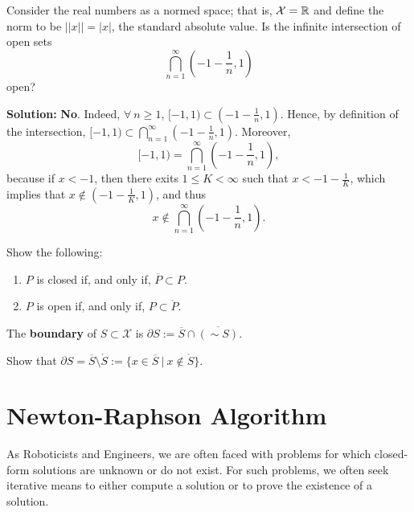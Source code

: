   
 \begin{example} Consider the real numbers as a normed space; that is,  ${\cal X} = \mathbb R$ and define the norm to be $||x|| = |x|$, the standard absolute value. Is the infinite intersection of open sets $$ \bigcap\limits_{n=1}^{\infty} (-1- \frac{1}{n}, 1)    $$ open?
 \end{example}
 
 \textbf{Solution:} \textbf{No}. Indeed, $\forall~n\ge 1$, $[-1,1) \subset (-1- \frac{1}{n}, 1)$. Hence, by definition of the intersection, $[-1,1) \subset \bigcap\limits_{n=1}^{\infty} (-1- \frac{1}{n}, 1)$. Moreover, $$[-1,1) = \bigcap\limits_{n=1}^{\infty} (-1- \frac{1}{n}, 1), $$
      because if $x<-1$, then there exits $1\le K<\infty$ such that $x < -1-\frac{1}{K}$, which implies that $x\not \in  (-1- \frac{1}{K}, 1)$, and thus
      $$ x \not \in \bigcap\limits_{n=1}^{\infty} (-1- \frac{1}{n}, 1). $$
      
\Qed
 
 \begin{exercise} Show the following:
  \begin{enumerate}
     \renewcommand{\labelenumi}{(\alph{enumi})}
        \setlength{\itemsep}{.1cm}
     \item $P$ is closed if, and only if, $\overline{P} \subset P$.
     \item $P$ is open if, and only if, $ P \subset \mathring{P}$.
 \end{enumerate}
 
 \end{exercise} 
 
 \begin{definition} The \textbf{boundary} of $S \subset \mathcal{X}$ is $\partial S:= \overline{S} \cap \overline{(\sim S)}.$
 \end{definition}
 
 \begin{exercise} Show that $\partial S= \overline{S} \setminus \mathring{S} := \{ x \in \overline{S}~|~ x \not \in \mathring{S}\}$.
 
 \end{exercise}

\section{Newton-Raphson Algorithm}

As Roboticists and Engineers, we are often faced with problems for which closed-form solutions are unknown or do not exist. For such problems, we often seek iterative means to either compute a solution or to prove the existence of a solution. \\


